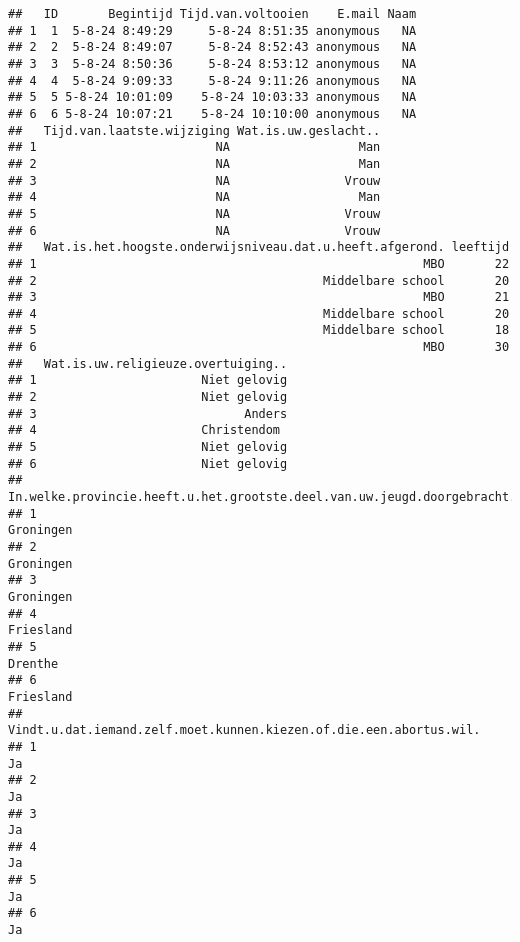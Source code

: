 \documentclass[
]{article}
\begin{document}
\begin{verbatim}
##   ID       Begintijd Tijd.van.voltooien    E.mail Naam
## 1  1  5-8-24 8:49:29     5-8-24 8:51:35 anonymous   NA
## 2  2  5-8-24 8:49:07     5-8-24 8:52:43 anonymous   NA
## 3  3  5-8-24 8:50:36     5-8-24 8:53:12 anonymous   NA
## 4  4  5-8-24 9:09:33     5-8-24 9:11:26 anonymous   NA
## 5  5 5-8-24 10:01:09    5-8-24 10:03:33 anonymous   NA
## 6  6 5-8-24 10:07:21    5-8-24 10:10:00 anonymous   NA
##   Tijd.van.laatste.wijziging Wat.is.uw.geslacht..
## 1                         NA                  Man
## 2                         NA                  Man
## 3                         NA                Vrouw
## 4                         NA                  Man
## 5                         NA                Vrouw
## 6                         NA                Vrouw
##   Wat.is.het.hoogste.onderwijsniveau.dat.u.heeft.afgerond. leeftijd
## 1                                                      MBO       22
## 2                                        Middelbare school       20
## 3                                                      MBO       21
## 4                                        Middelbare school       20
## 5                                        Middelbare school       18
## 6                                                      MBO       30
##   Wat.is.uw.religieuze.overtuiging..
## 1                       Niet gelovig
## 2                       Niet gelovig
## 3                             Anders
## 4                       Christendom 
## 5                       Niet gelovig
## 6                       Niet gelovig
##   In.welke.provincie.heeft.u.het.grootste.deel.van.uw.jeugd.doorgebracht.
## 1                                                               Groningen
## 2                                                               Groningen
## 3                                                               Groningen
## 4                                                               Friesland
## 5                                                                 Drenthe
## 6                                                               Friesland
##   Vindt.u.dat.iemand.zelf.moet.kunnen.kiezen.of.die.een.abortus.wil.
## 1                                                                 Ja
## 2                                                                 Ja
## 3                                                                 Ja
## 4                                                                 Ja
## 5                                                                 Ja
## 6                                                                 Ja

\end{verbatim}
\end{document}

